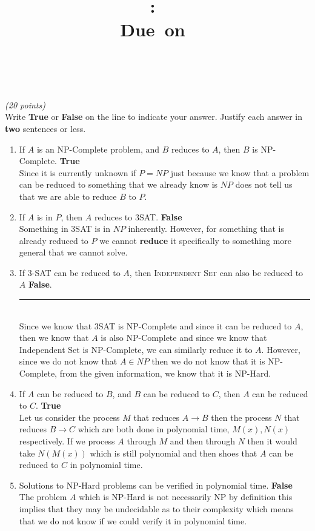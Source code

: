 \documentclass{article}
\title{
    \vspace{2in}
    \textmd{\textbf{\hmwkClass:\ \hmwkTitle}}\\
    \normalsize\vspace{0.1in}\small{Due\ on\ \hmwkDueDate}\\
    \vspace{0.1in}\large{\textit{\hmwkClassInstructor\ \hmwkClassTime}}
    \vspace{3in}
}
\author{\hmwkAuthorName}
\date{}
\newcounter{ProblemCounter}
\newenvironment{problem}[1][Problem]{
 \begin{trivlist}
 \item[\hskip \labelsep {\bfseries #1}\hskip \labelsep {%
 \bfseries \theProblemCounter.%
 \stepcounter{ProblemCounter}%
 }]
}{
 \end{trivlist}
}
\begin{document}
\maketitle

\clearpage

\begin{problem}\textit{(20 points)}\\
Write \textbf{True} or \textbf{False} on the line to indicate your answer. Justify each answer in \textbf{two} sentences or less. \vspace{0.1in}
\begin{enumerate}[label=\textbf{\alph*.)}]
    \item If $A$ is an NP-Complete problem, and $B$ reduces to $A$, then $B$ is NP-Complete. \textbf{True}\\
    Since it is currently unknown if $P = NP$ just because we know that a problem can be reduced to something that we already know is $NP$ does not tell us that we are able to reduce $B$ to $P.$
    
    \item If $A$ is in $P$, then $A$ reduces to \textsc{3SAT}. \textbf{False}\\
    Something in 3SAT is in $NP$ inherently. However, for something that is already reduced to $P$ we cannot \textbf{reduce} it specifically to something more general that we cannot solve.
    
    \item If \textsc{3-SAT} can be reduced to $A$, then \textsc{Independent Set} can also be reduced to $A$ \textbf{False}. \rule{2.5cm}{0.4pt} \\
    Since we know that 3SAT is NP-Complete and since it can be reduced to $A$, then we know that $A$ is also NP-Complete and since we know that Independent Set is NP-Complete, we can similarly reduce it to $A$. However, since we do not know that $A \in NP$ then we do not know that it is NP-Complete, from the given information, we know that it is NP-Hard.
    
    \item If $A$ can be reduced to $B$, and $B$ can be reduced to $C$, then $A$ can be reduced to $C$. \textbf{True}\\
    Let us consider the process $M$ that reduces $A \to B$ then the process $N$ that reduces $B \to C$ which are both done in polynomial time, $M(x), N(x)$ respectively. If we process $A$ through $M$ and then through $N$ then it would take $N(M(x))$ which is still polynomial and then shoes that $A$ can be reduced to $C$ in polynomial time.
    
    \item Solutions to NP-Hard problems can be verified in polynomial time. \textbf{False}\\
    The problem $A$ which is NP-Hard is not necessarily NP by definition this implies that they may be undecidable as to their complexity which means that we do not know if we could verify it in polynomial time.
\end{enumerate}
\end{problem}
\end{document}
